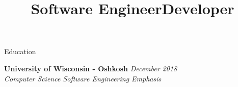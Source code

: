 \documentclass{resume} %
\title{Software Engineer} %
\title{Developer} %
\begin{document}

\begin{rSection}{Education}

{\bf University of Wisconsin - Oshkosh} \hfill {\em December 2018} \\
{\em Computer Science \seperator Software Engineering Emphasis} 

\end{rSection}

\end{document}
